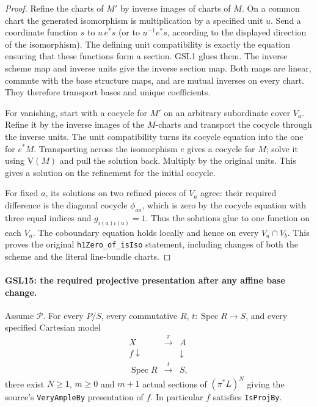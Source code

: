 \documentclass[11pt,a4paper]{article}
\numberwithin{equation}{section}
\theoremstyle{remark}\newtheorem{remark}[theorem]{Remark}
\begin{document}
\begin{proof}
Refine the charts of $M'$ by inverse images of charts of $M$.
On a common chart the generated isomorphism is multiplication by
a specified unit $u$.  Send a coordinate function $s$ to
$u\,e^*s$ (or to $u^{-1}e^*s$, according to the displayed direction
of the isomorphism).  The defining unit compatibility is exactly
the equation ensuring that these functions form a section.
GSL1 glues them.  The inverse scheme map and inverse units give
the inverse section map.  Both maps are linear, commute with the
base structure maps, and are mutual inverses on every chart.
They therefore transport bases and unique coefficients.

For vanishing, start with a cocycle for $M'$ on an arbitrary
subordinate cover $V_a$.  Refine it by the inverse images of
the $M$-charts and transport the cocycle through the inverse units.
The unit compatibility turns its cocycle equation into the one
for $e^*M$.  Transporting across the isomorphism $e$ gives a
cocycle for $M$; solve it using $\mathrm V(M)$ and pull the
solution back.  Multiply by the original units.  This gives a
solution on the refinement for the initial cocycle.

For fixed $a$, its solutions on two refined pieces of $V_a$
agree: their required difference is the diagonal cocycle
$\phi_{aa}$, which is zero by the cocycle equation with three
equal indices and $g_{i(a)i(a)}=1$.  Thus the solutions glue to
one function on each $V_a$.  The coboundary equation holds
locally and hence on every $V_a\cap V_b$.  This proves the
original \texttt{h1Zero\_\allowbreak of\_\allowbreak is\allowbreak Iso} statement, including changes
of both the scheme and the literal line-bundle charts.
\end{proof}

\paragraph{GSL15: the required projective presentation after any affine base change.}
\label{claim:GSL15}
Assume $\mathcal P$.  For every $P/S$, every commutative $R$,
$t:\operatorname{Spec}R\to S$, and every specified Cartesian model
\[
 \begin{array}{ccc}
 X&\xrightarrow{\pi}&A\\
 f\downarrow&&\downarrow\\
 \operatorname{Spec}R&\xrightarrow{t}&S,
 \end{array}
\]
there exist $N\ge1$, $m\ge0$ and $m+1$ actual sections of
$(\pi^*L)^N$ giving the source's \texttt{Very\allowbreak Ample\allowbreak By} presentation
of $f$.  In particular $f$ satisfies \texttt{Is\allowbreak Proj\allowbreak By}.
\end{document}
